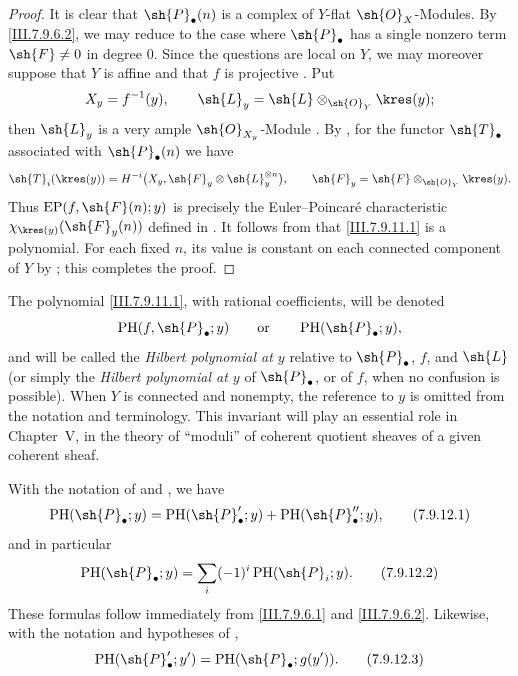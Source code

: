 \begin{proof}
It is clear that $\sh{P}_\bullet(n)$ is a complex of
$Y$-flat $\sh{O}_X$-Modules.  By
\eqref{III.7.9.6.2}, we may reduce to the case where
$\sh{P}_\bullet$ has a single nonzero term
$\sh{F}\neq0$ in degree $0$.  Since the questions are
local on $Y$, we may moreover suppose that $Y$ is affine
and that $f$ is projective .  Put
\[
  X_y=f^{-1}(y),\qquad
  \sh{L}_y=\sh{L}\otimes_{\sh{O}_Y}\kres(y);
\]
then $\sh{L}_y$ is a very ample $\sh{O}_{X_y}$-Module
.  By , for the
functor $\sh{T}_\bullet$ associated with
$\sh{P}_\bullet(n)$ we have
\[
  \sh{T}_i(\kres(y))
  =
  H^{-i}\bigl(
    X_y,\sh{F}_y\otimes\sh{L}_y^{\otimes n}\bigr),
  \qquad
  \sh{F}_y=\sh{F}\otimes_{\sh{O}_Y}\kres(y).
\]
Thus $\operatorname{EP}(f,\sh{F}(n);y)$ is precisely the
Euler--Poincar\'e characteristic
$\chi_{\kres(y)}(\sh{F}_y(n))$ defined in
.  It follows from  that
\eqref{III.7.9.11.1} is a polynomial.  For each fixed
$n$, its value is constant on each connected component of
$Y$ by ; this completes the proof.
\end{proof}

\begin{env}[7.9.12]
\label{III.7.9.12}
The polynomial \eqref{III.7.9.11.1}, with rational
coefficients, will be denoted
\[
  \operatorname{PH}(f,\sh{P}_\bullet;y)
  \qquad\text{or}\qquad
  \operatorname{PH}(\sh{P}_\bullet;y),
\]
and will be called the \emph{Hilbert polynomial at $y$}
relative to $\sh{P}_\bullet$, $f$, and $\sh{L}$ (or simply
the \emph{Hilbert polynomial at $y$} of
$\sh{P}_\bullet$, or of $f$, when no confusion is
possible).  When $Y$ is connected and nonempty, the
reference to $y$ is omitted from the notation and
terminology.  This invariant will play an essential role
in Chapter~V, in the theory of ``moduli'' of coherent
quotient sheaves of a given coherent sheaf.

With the notation of  and
, we have
\[
  \operatorname{PH}(\sh{P}_\bullet;y)
  =
  \operatorname{PH}(\sh{P}'_\bullet;y)
  +
  \operatorname{PH}(\sh{P}''_\bullet;y),
  \tag{7.9.12.1}\label{III.7.9.12.1}
\]
and in particular
\[
  \operatorname{PH}(\sh{P}_\bullet;y)
  =
  \sum_i(-1)^i\operatorname{PH}(\sh{P}_i;y).
  \tag{7.9.12.2}\label{III.7.9.12.2}
\]
These formulas follow immediately from
\eqref{III.7.9.6.1} and \eqref{III.7.9.6.2}.  Likewise,
with the notation and hypotheses of ,
\[
  \operatorname{PH}(\sh{P}'_\bullet;y')
  =
  \operatorname{PH}(\sh{P}_\bullet;g(y')).
  \tag{7.9.12.3}\label{III.7.9.12.3}
\]
\end{env}

